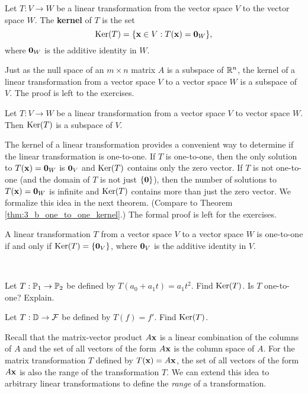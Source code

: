\begin{definition} Let $T : V \to W$ be a linear transformation from the vector space $V$ to the vector space $W$. The \textbf{kernel} of $T$ is the set
\[\text{Ker}(T) = \{\mathbf{x} \in V : T(\mathbf{x}) = \mathbf{0}_W\},\]
where $\mathbf{0}_W$ is the additive identity in $W$.
\end{definition}

Just as the null space of an $m \times n$ matrix $A$ is a subspace of $\mathbb{R}^n$, the kernel of a linear transformation from a vector space $V$ to a vector space $W$ is a subspace of $V$. The proof is left to the exercises.  

\begin{theorem} \label{thm:8_a_ker} Let $T : V \to W$ be a linear transformation from a vector space $V$ to vector space $W$. Then $\text{Ker}(T)$ is a subspace of $V$.
\end{theorem}


The kernel of a linear transformation provides a convenient way to determine if the linear transformation is one-to-one. If $T$ is one-to-one, then the only solution to $T(\mathbf{x}) = \mathbf{0}_W$ is $\mathbf{0}_V$ and $\text{Ker}(T)$ contains only the zero vector. If $T$ is not one-to-one (and the domain of $T$ is not just $\{\mathbf{0}\}$), then the number of solutions to $T(\mathbf{x}) = \mathbf{0}_W$ is infinite and $\text{Ker}(T)$ contains more than just the zero vector. We formalize this idea in the next theorem. (Compare to Theorem \ref{thm:3_b_one_to_one_kernel}.) The formal proof is left for the exercises. 

\begin{theorem} \label{thm:8_a_one_to_one_kernel} A linear transformation $T$ from a vector space $V$ to a vector space $W$ is one-to-one if and only if $\text{Ker}(T) = \{\mathbf{0}_V\}$, where $\mathbf{0}_V$ is the additive identity in $V$.
\end{theorem}


\begin{activity}  \label{act:8_a_Lin_trans_1} ~
\ba
\item Let $T: \mathbb{P}_1 \to \mathbb{P}_2$ be defined by $T(a_0+a_1t) = a_1t^2$. Find $\text{Ker}(T)$. Is $T$ one-to-one? Explain.
\item Let $T: \mathbb{D} \to \mathcal{F}$ be defined by $T(f) = f'$. Find $\text{Ker}(T)$.
\ea
\end{activity}

Recall that the matrix-vector product $A \mathbf{x}$ is a linear combination of the columns of $A$ and the set of all vectors of the form $A \mathbf{x}$ is the column space of $A$. For the matrix transformation $T$ defined by $T(\mathbf{x}) = A\mathbf{x}$, the set of all vectors of the form $A \mathbf{x}$ is also the range of the transformation $T$. We can extend this idea to arbitrary linear transformations to define the \emph{range} of a transformation. 

